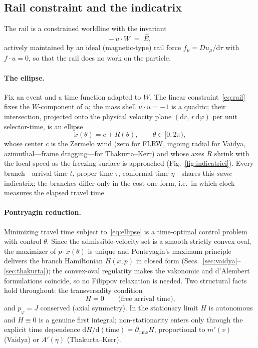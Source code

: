 \documentclass[12pt]{iopart}
\newcommand{\Ehat}{\hat E}
\newcommand{\dd}{\mathrm{d}}
\begin{document}
\subsection{Rail constraint and the indicatrix}
\label{sec:indicatrix}
The rail is a constrained worldline with the invariant
\begin{equation}
    -\,u\cdot W \;=\; \Ehat ,
    \label{eq:rail}
\end{equation}
actively maintained by an ideal (magnetic-type) rail force $f_\mu=Du_\mu/\dd\tau$
with $f\cdot u=0$, so that the rail does no work on the particle.

\paragraph{The ellipse.} Fix an event and a time function adapted to $W$. The
linear constraint~\eqref{eq:rail} fixes the $W$-component of $u$; the mass shell
$u\cdot u=-1$ is a quadric; their intersection, projected onto the physical
velocity plane $(\dd r,\,r\,\dd\varphi)$ per unit selector-time, is an ellipse
\begin{equation}
    \dot x(\theta)=c+R(\theta),\qquad \theta\in[0,2\pi),
    \label{eq:ellipse}
\end{equation}
whose center $c$ is the Zermelo wind (zero for FLRW, ingoing radial for Vaidya,
azimuthal---frame dragging---for Thakurta--Kerr) and whose axes $R$ shrink with
the local speed as the freezing surface is approached (Fig.~\ref{fig:indicatrici}).
Every branch---arrival time $t$, proper time $\tau$, conformal time $\eta$---shares
this \emph{same} indicatrix; the branches differ only in the cost one-form, i.e.\
in which clock measures the elapsed travel time.

\paragraph{Pontryagin reduction.} Minimizing travel time subject
to~\eqref{eq:ellipse} is a time-optimal control problem with control $\theta$.
Since the admissible-velocity set is a smooth strictly convex oval, the maximizer
of $p\cdot\dot x(\theta)$ is unique and Pontryagin's maximum principle
\cite{Pontryagin,Liberzon} delivers the branch Hamiltonian $H(x,p)$ in closed
form (Secs.~\ref{sec:vaidya}--\ref{sec:thakurta}); the convex-oval regularity
makes the vakonomic and d'Alembert formulations coincide, so no Filippov
relaxation is needed. Two structural facts hold throughout: the transversality
condition
\begin{equation}
    H=0 \qquad\text{(free arrival time),}
    \label{eq:transversality}
\end{equation}
and $p_\varphi=J$ conserved (axial symmetry). In the stationary limit $H$ is
autonomous and $H\equiv0$ is a genuine first integral; non-stationarity enters
only through the explicit time dependence $\dd H/\dd(\text{time})=
\partial_{\text{time}}H$, proportional to $m'(v)$ (Vaidya) or $A'(\eta)$
(Thakurta--Kerr).
\end{document}
